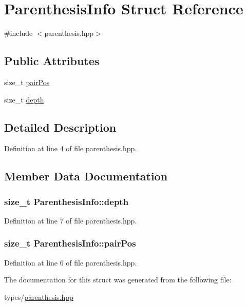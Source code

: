 \hypertarget{struct_parenthesis_info}{}\section{Parenthesis\+Info Struct Reference}
\label{struct_parenthesis_info}


{\ttfamily \#include $<$parenthesis.\+hpp$>$}

\subsection*{Public Attributes}
\begin{DoxyCompactItemize}
\item 
size\+\_\+t \hyperlink{struct_parenthesis_info_a42759243dab890dc42d22120daef0440}{pair\+Pos}
\item 
size\+\_\+t \hyperlink{struct_parenthesis_info_adc597d13835a1102eefb3f8fa3147997}{depth}
\end{DoxyCompactItemize}


\subsection{Detailed Description}


Definition at line 4 of file parenthesis.\+hpp.



\subsection{Member Data Documentation}
\hypertarget{struct_parenthesis_info_adc597d13835a1102eefb3f8fa3147997}{}
\subsubsection[{depth}]{\setlength{\rightskip}{0pt plus 5cm}size\+\_\+t Parenthesis\+Info\+::depth}\label{struct_parenthesis_info_adc597d13835a1102eefb3f8fa3147997}


Definition at line 7 of file parenthesis.\+hpp.

\hypertarget{struct_parenthesis_info_a42759243dab890dc42d22120daef0440}{}
\subsubsection[{pair\+Pos}]{\setlength{\rightskip}{0pt plus 5cm}size\+\_\+t Parenthesis\+Info\+::pair\+Pos}\label{struct_parenthesis_info_a42759243dab890dc42d22120daef0440}


Definition at line 6 of file parenthesis.\+hpp.



The documentation for this struct was generated from the following file\+:\begin{DoxyCompactItemize}
\item 
types/\hyperlink{parenthesis_8hpp}{parenthesis.\+hpp}\end{DoxyCompactItemize}
